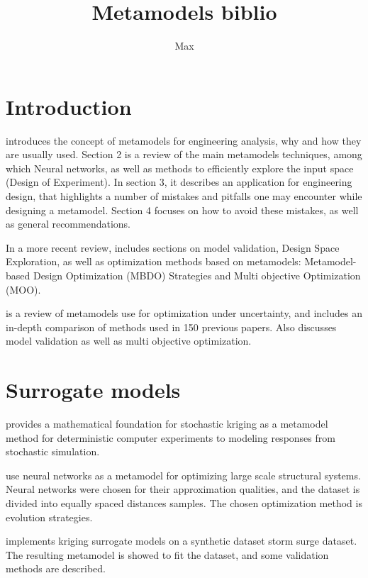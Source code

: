 \documentclass{article}
\title{Metamodels biblio}
\author{Max}
\begin{document}
\maketitle

\section{Introduction}

    \cite{Simpson2001MetamodelsFC} introduces the concept of metamodels for engineering  analysis, why and how they are usually used. Section 2 is a review of the main metamodels techniques, among which Neural networks, as well as methods to efficiently explore the input space (Design of Experiment). In section 3, it describes an application for engineering  design, that highlights a number of mistakes and pitfalls one may encounter while designing a metamodel. Section 4 focuses on how to avoid these mistakes, as well as general recommendations.

    In a more recent review, \cite{Wang2006ReviewOM} includes sections on model validation, Design Space Exploration, as well as optimization methods based on metamodels: Metamodel-based Design Optimization (MBDO) Strategies and Multi objective Optimization (MOO). 

    \cite{Parnianifard2018AnOO} is a review of metamodels use for optimization under uncertainty, and includes an in-depth comparison of methods used in 150 previous papers. Also discusses model validation as well as multi objective optimization.

\section{Surrogate models}

    \cite{Ankenman2008StochasticKF} provides a mathematical foundation for stochastic kriging as a metamodel method for deterministic computer experiments to modeling responses from stochastic simulation.

    \cite{Papadrakakis2002ReliabilitybasedSO} use neural networks as a metamodel for optimizing large scale structural systems. Neural networks were chosen for their approximation qualities, and the dataset is divided into equally spaced distances samples. The chosen optimization method is evolution strategies.

    \cite{Jia2015SurrogateMF} implements kriging surrogate models on a synthetic dataset storm surge dataset. The resulting metamodel is showed to fit the dataset, and some validation methods are described.
\end{document}
